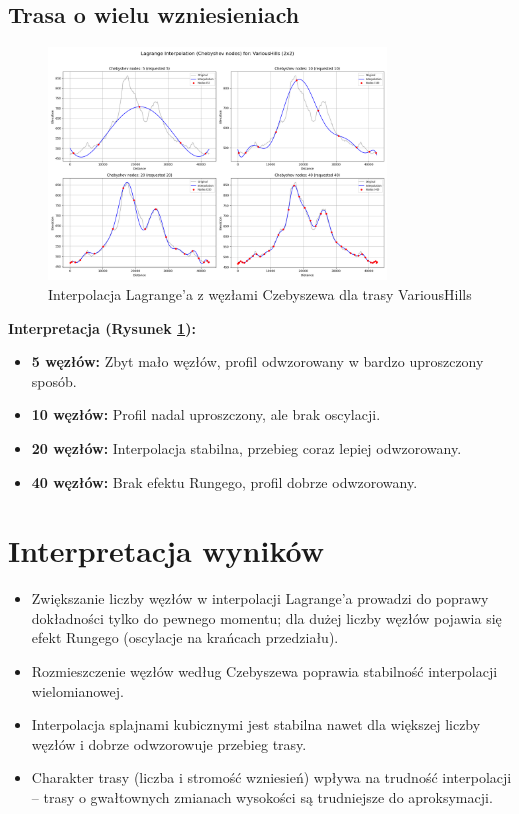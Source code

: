 \documentclass[11pt,a4paper]{article}
\begin{document}
\subsection{Trasa o wielu wzniesieniach}
\begin{figure}[H]
    \centering
    \includegraphics[width=0.8\textwidth]{../plots/VariousHills_Lagrange_Chebyshev_2x2.png}
    \caption{Interpolacja Lagrange'a z węzłami Czebyszewa dla trasy VariousHills}
    \label{fig:wiele_wzniesien}
\end{figure}
\textbf{Interpretacja (Rysunek \ref{fig:wiele_wzniesien}):} 
\begin{itemize}
    \item \textbf{5 węzłów:} Zbyt mało węzłów, profil odwzorowany w bardzo uproszczony sposób.
    \item \textbf{10 węzłów:} Profil nadal uproszczony, ale brak oscylacji.
    \item \textbf{20 węzłów:} Interpolacja stabilna, przebieg coraz lepiej odwzorowany.
    \item \textbf{40 węzłów:} Brak efektu Rungego, profil dobrze odwzorowany.
\end{itemize}

\newpage
\section{Interpretacja wyników}
\begin{itemize}
    \item Zwiększanie liczby węzłów w interpolacji Lagrange'a prowadzi do poprawy dokładności tylko do pewnego momentu; dla dużej liczby węzłów pojawia się efekt Rungego (oscylacje na krańcach przedziału).
    \item Rozmieszczenie węzłów według Czebyszewa poprawia stabilność interpolacji wielomianowej.
    \item Interpolacja splajnami kubicznymi jest stabilna nawet dla większej liczby węzłów i dobrze odwzorowuje przebieg trasy.
    \item Charakter trasy (liczba i stromość wzniesień) wpływa na trudność interpolacji -- trasy o gwałtownych zmianach wysokości są trudniejsze do aproksymacji.
\end{itemize}
\end{document}
